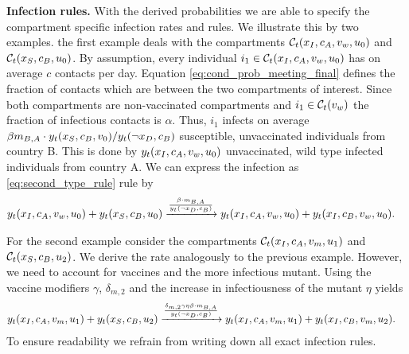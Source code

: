 \noindent \textbf{Infection rules.} With the derived probabilities we are able to specify the compartment specific infection rates and rules. We illustrate this by two examples. the first example deals with the compartments $\mathcal{C}_t(x_{I}, c_A, v_w, u_0)$ and $\mathcal{C}_t(x_{S}, c_B, u_0)$. By assumption, every individual $i_1 \in \mathcal{C}_t(x_{I}, c_A, v_w, u_0)$ has on average $c$ contacts per day. Equation \eqref{eq:cond_prob_meeting_final} defines the fraction of contacts which are between the two compartments of interest. Since both compartments are non-vaccinated compartments and $i_1 \in \mathcal{C}_t(v_w)$ the fraction of infectious contacts is $\alpha$. Thus, $i_1$ infects on average $\beta m_{B,A} \cdot y_t(x_S, c_B, v_0) / y_t(\neg x_D, c_B)$ susceptible, unvaccinated individuals from country B. This is done by $y_t(x_{I}, c_A, v_w, u_0)$ unvaccinated, wild type infected individuals from country A. We can express the infection as \ref{eq:second_type_rule} rule by
\begin{align*}
y_t(x_{I}, c_A, v_w, u_0) + y_t(x_{S}, c_B, u_0) &\xrightarrow{ \frac{\beta \cdot m_{B,A} }{ y_t(\neg x_D, c_B) }} y_t(x_{I}, c_A, v_w, u_0) + y_t(x_{I}, c_B, v_w, u_0).
\end{align*}

For the second example consider the compartments $\mathcal{C}_t(x_{I}, c_A, v_m, u_1)$ and $\mathcal{C}_t(x_{S}, c_B, u_2)$. We derive the rate analogously to the previous example. However, we need to account for vaccines and the more infectious mutant. Using the vaccine modifiers $\gamma$, $\delta_{m, 2}$ and the increase in infectiousness of the mutant $\eta$ yields
\begin{align*}
y_t(x_{I}, c_A, v_m, u_1) + y_t(x_{S}, c_B, u_2) &\xrightarrow{ \frac{\delta_{m,2} \gamma \eta \beta \cdot m_{B,A} }{ y_t(\neg x_D, c_B) }} y_t(x_{I}, c_A, v_m, u_1) + y_t(x_{I}, c_B, v_m, u_2).
\end{align*}
To ensure readability we refrain from writing down all exact infection rules.

